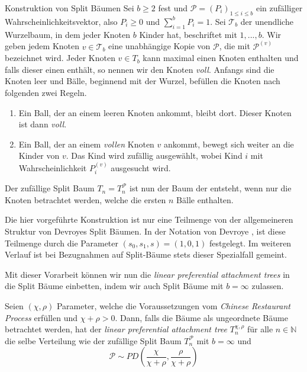 \begin{section}{Konstruktion von Split Bäumen}
Sei $b \geq 2$ fest und $\mathcal{P} = (P_i)_{1 \leq i \leq b}$ ein zufälliger Wahrscheinlichkeitsvektor, also $P_i \geq 0$ und $\sum_{i=1}^{b}P_i = 1$. Sei $\mathcal{T}_b$ der unendliche Wurzelbaum, in dem jeder Knoten $b$ Kinder hat, beschriftet mit $1,...,b$. Wir geben jedem Knoten $v \in \mathcal{T}_b$ eine unabhängige Kopie von $\mathcal{P}$, die mit $\mathcal{P}^{(v)}$ bezeichnet wird. Jeder Knoten $v \in T_b$ kann maximal einen Knoten enthalten und falls dieser einen enthält, so nennen wir den Knoten \textit{voll}. Anfangs sind die Knoten leer und Bälle, beginnend mit der Wurzel, befüllen die Knoten nach folgenden zwei Regeln.
\begin{enumerate}
    \item Ein Ball, der an einem leeren Knoten ankommt, bleibt dort. Dieser Knoten ist dann \textit{voll}.
    \item Ein Ball, der an einem \textit{vollen} Knoten $v$ ankommt, bewegt sich weiter an die Kinder von $v$. Das Kind wird zufällig ausgewählt, wobei Kind $i$ mit Wahrscheinlichkeit $P_i^{(v)}$ ausgesucht wird.
\end{enumerate}
Der zufällige Split Baum $T_n = T_n^{\mathcal{P}}$ ist nun der Baum der entsteht, wenn nur die Knoten betrachtet werden, welche die ersten $n$ Bälle enthalten.
\begin{Bemerkung}
    Die hier vorgeführte Konstruktion ist nur eine Teilmenge von der allgemeineren Struktur von Devroyes Split Bäumen. In der Notation von Devroye \cite{devroye1998universal}, ist diese Teilmenge durch die Parameter $(s_0,s_1,s) = (1,0,1)$ festgelegt. Im weiteren Verlauf ist bei Bezugnahmen auf Split-Bäume stets dieser Spezialfall gemeint.
\end{Bemerkung}
\end{section}
Mit dieser Vorarbeit können wir nun die \textit{linear preferential attachment trees} in die Split Bäume einbetten, indem wir auch Split Bäume mit $b = \infty$ zulassen.
\begin{theorem}
    \label{main theorem paper}
    Seien $(\chi,\rho)$ Parameter, welche die Voraussetzungen vom \textit{Chinese Restaurant Process} erfüllen und $\chi + \rho > 0$. Dann, falls die Bäume als ungeordnete Bäume betrachtet werden, hat der \textit{linear preferential attachment tree} $T_n^{\chi,\rho}$ für alle $n \in \mathbb{N}$ die selbe Verteilung wie der zufällige Split Baum $T^\mathcal{P}_n$ mit $b = \infty$ und 
    \[ 
    \mathcal{P} \sim PD(\frac{\chi}{\chi + \rho}, \frac{\rho}{\chi + \rho})
    \] 
\end{theorem}
